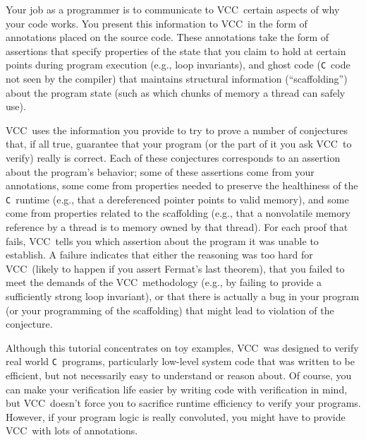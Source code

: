 \documentclass{report}
\newcommand{\Q}[1]{\lstinline~#1~}
\newcommand{\C}{\Q{C}}
\newcommand{\VCC}{VCC}
\begin{document}
Your job as a programmer is to communicate to \VCC\ certain aspects of
why your code works. You present this information to \VCC\ in the form
of annotations placed on the source code. These annotations take the
form of assertions that specify properties of the state that you claim
to hold at certain points during program execution (e.g., loop
invariants), and ghost code (\C\ code not seen by the compiler) that
maintains structural information (``scaffolding'') about the program
state (such as which chunks of memory a thread can safely use).

\VCC\ uses the information you provide to try to prove a number of
conjectures that, if all true, guarantee that your program (or the
part of it you ask \VCC\ to verify) really is correct. Each of these
conjectures corresponds to an assertion about the program's behavior;
some of these assertions come from your annotations, some come from
properties needed to preserve the healthiness of the \C\ runtime
(e.g., that a dereferenced pointer points to valid memory), and some
come from properties related to the scaffolding (e.g., that a
nonvolatile memory reference by a thread is to memory owned by that
thread). For each proof that fails, \VCC\ tells you which assertion
about the program it was unable to establish. A failure indicates that
either the reasoning was too hard for \VCC\ (likely to happen if you
assert Fermat's last theorem), that you failed to meet the demands of
the \VCC\ methodology (e.g., by failing to provide a sufficiently
strong loop invariant), or that there is actually a bug in your
program (or your programming of the scaffolding) that might lead to
violation of the conjecture.

Although this tutorial concentrates on toy examples, \VCC\ was
designed to verify real world \C\ programs, particularly low-level
system code that was written to be efficient, but not necessarily easy
to understand or reason about. Of course, you can make your
verification life easier by writing code with verification in mind,
but \VCC\ doesn't force you to sacrifice runtime efficiency to verify
your programs. However, if your program logic is really convoluted,
you might have to provide \VCC\ with lots of annotations.
\end{document}
